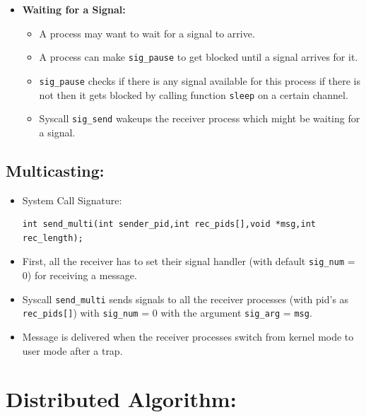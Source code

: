 \documentclass[a4 paper]{article}
\newcommand{\code}[1]{\texttt{#1}}
\begin{document}
\begin{itemize}
  \item \textbf{Waiting for a Signal:}
  \begin{itemize}
    \item A process may want to wait for a signal to arrive. 
    \item A process can make \code{sig\_pause} to get blocked until a signal arrives for it.
    \item \code{sig\_pause} checks if there is any signal available for this process if there is not then it gets blocked by calling function \code{sleep} on a certain channel.
    \item Syscall \code{sig\_send} wakeups the receiver process which might be waiting for a signal. 
  \end{itemize}
\end{itemize}

\subsection*{Multicasting:}

\begin{itemize}
  \item System Call Signature:
  \begin{lstlisting}
int send_multi(int sender_pid,int rec_pids[],void *msg,int rec_length);
  \end{lstlisting}
  \vspace*{-3mm}
  \item First, all the receiver has to set their signal handler (with default \code{sig\_num} = 0) for receiving a message.
  \item Syscall \code{send\_multi} sends signals to all the receiver processes (with pid's as \code{rec\_pids[]}) with \code{sig\_num} = 0 with the argument \code{sig\_arg} = \code{msg}.
  \item Message is delivered when the receiver processes switch from kernel mode to user mode after a trap.
\end{itemize}


\section{Distributed Algorithm:}
\end{document}
